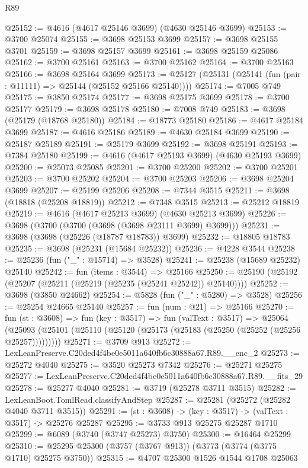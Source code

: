 \begin{lexlean}{R89}
\begin{coremodule}
@25152 := @4616 (@4617 @25146 @3699) (@4630 @25146 @3699)
@25153 := @3700 @25074
@25155 := @3698 @25153 @3699
@25157 := @3698 @25155 @3701
@25159 := @3698 @25157 @3699
@25161 := @3698 @25159 @25086
@25162 := @3700 @25161
@25163 := @3700 @25162
@25164 := @3700 @25163
@25166 := @3698 @25164 @3699
@25173 := @25127 (@25131 (@25141 (fun (pair : @11111) => @25144 (@25152 @25166 @25140))))
@25174 := @7005 @749
@25175 := @3850 @25174
@25177 := @3698 @25175 @3699
@25178 := @3700 @25177
@25179 := @3698 @25178
@25180 := @7008 @749
@25183 := @3698 (@25179 (@18768 @25180))
@25184 := @18773 @25180
@25186 := @4617 @25184 @3699
@25187 := @4616 @25186
@25189 := @4630 @25184 @3699
@25190 := @25187 @25189
@25191 := @25179 @3699
@25192 := @3698 @25191
@25193 := @7384 @25180
@25199 := @4616 (@4617 @25193 @3699) (@4630 @25193 @3699)
@25200 := @25073 @25085
@25201 := @3700 @25200
@25202 := @3700 @25201
@25203 := @3700 @25202
@25204 := @3700 @25203
@25206 := @3698 @25204 @3699
@25207 := @25199 @25206
@25208 := @7344 @3515
@25211 := @3698 (@18818 (@25208 @18819))
@25212 := @7348 @3515
@25213 := @25212 @18819
@25219 := @4616 (@4617 @25213 @3699) (@4630 @25213 @3699)
@25226 := @3698 (@3700 (@3700 (@3698 (@3698 @23111 @3699) @3699)))
@25231 := @3698 (@3698 (@25226 (@18787 @18783)) @3699)
@25232 := @18805 @18783
@25235 := @3698 (@25231 (@15684 @25232))
@25236 := @4228 @3544
@25238 := @25236 (fun ("_" : @15714) => @3528)
@25241 := @25238 (@15689 @25232) @25140
@25242 := fun (items : @3544) => @25166
@25250 := @25190 (@25192 (@25207 (@25211 (@25219 (@25235 (@25241 @25242)) @25140))))
@25252 := @3698 (@3850 @24662)
@25254 := @5828 (fun ("_" : @5280) => @3528)
@25256 := @25254 @24665 @25140
@25257 := fun (num : @21) => @25166
@25270 := fun (st : @3608) =>
  fun (key : @3517) =>
  fun (valText : @3517) =>
  @25064 (@25093 (@25101 (@25110 (@25120 (@25173 (@25183 (@25250 (@25252 (@25256 @25257)))))))))
@25271 := @3709 @913
@25272 := LexLeanPreserve.C20ded4f4be0e5011a640fb6c30888a67.R89.__enc_2
@25273 := @25272 @4040
@25275 := @3520 @25273 @7342
@25276 := @25271 @25275
@25277 := LexLeanPreserve.C20ded4f4be0e5011a640fb6c30888a67.R89.__fits_29
@25278 := @25277 @4040
@25281 := @3719 (@25278 @3711 @3515)
@25282 := LexLeanBoot.TomlRead.classifyAndStep
@25287 := @25281 (@25272 (@25282 @4040 @3711 @3515))
@25291 := (st : @3608) -> (key : @3517) -> (valText : @3517) -> @25276 @25287
@25295 := @3733 @913 @25275 @25287 @1710
@25299 := @6089 (@3740 (@3747 @25273) @3750)
@25300 := @16464 @25299
@25310 := @25295 @25300 (@3757 (@3767 @913)) (@3773 (@3774 (@3775 @1710) @25275 @3750))
@25315 := @4707 @25300 @1526 @1544 @1708 @25063

\end{coremodule}
\end{lexlean}
